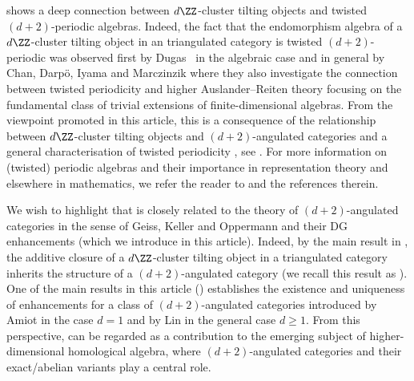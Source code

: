\documentclass[a4paper]{amsart}
\begin{document}
 shows a deep connection between
$d\ZZ$-cluster tilting objects and twisted $(d+2)$-periodic algebras. Indeed,
the fact that the endomorphism algebra of a $d\ZZ$-cluster tilting object in an
triangulated category is twisted $(d+2)$-periodic was observed first
by Dugas~\cite{Dug12} in the algebraic case and in general by Chan, Darp{\"o}, Iyama and
Marczinzik \cite{CDIM20} where they also investigate the
connection between twisted periodicity and higher Auslander--Reiten theory
focusing on the fundamental class of trivial extensions of finite-dimensional
algebras. From the viewpoint promoted in this article, this is a consequence of
the relationship between $d\ZZ$-cluster tilting objects and $(d+2)$-angulated
categories and a general characterisation of twisted periodicity
\cite{GSS03,Han20}, see . For more
information on (twisted) periodic algebras and their importance in
representation theory and elsewhere in mathematics, we refer the reader to
\cite{ES08,CDIM20} and the references therein.

We wish to highlight that  is closely
related to the theory of $(d+2)$-angulated categories in the sense of Geiss,
Keller and Oppermann \cite{GKO13} and their DG enhancements (which we introduce
in this article). Indeed, by the main result in \cite{GKO13}, the additive
closure of a $d\ZZ$-cluster tilting object in a triangulated category inherits
the structure of a $(d+2)$-angulated category (we recall this result as
). One of the main results in this article
() establishes the existence and
uniqueness of enhancements for a class of $(d+2)$-angulated categories
introduced by Amiot \cite{Ami07} in the case $d=1$ and by Lin \cite{Lin19} in
the general case $d\geq1$. From this perspective,
 can be regarded as a contribution to the
emerging subject of higher-dimensional homological algebra, where
$(d+2)$-angulated categories and their exact/abelian variants \cite{Jas16} play a central
role.
\end{document}
